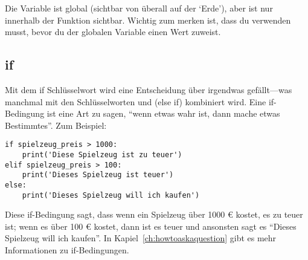 Die Variable  ist global (sichtbar von überall auf der `Erde'), aber  ist nur innerhalb der Funktion sichtbar. Wichtig zum merken ist, dass du  verwenden musst, bevor du der globalen Variable einen Wert zuweist.

\subsection*{if}

Mit dem if Schlüsselwort wird eine Entscheidung über irgendwas gefällt---was manchmal mit den Schlüsselworten  und  (else if) kombiniert wird. Eine if-Bedingung ist eine Art zu sagen, ``wenn etwas wahr ist, dann mache etwas Bestimmtes''. Zum Beispiel:

\begin{Verbatim}[frame=single]
if spielzeug_preis > 1000:
    print('Diese Spielzeug ist zu teuer')
elif spielzeug_preis > 100:
    print('Dieses Spielzeug ist teuer')
else:
    print('Dieses Spielzeug will ich kaufen')
\end{Verbatim}

Diese if-Bedingung sagt, dass wenn ein Spielzeug über 1000 € kostet, es zu teuer ist; wenn es über 100 € kostet, dann ist es teuer und ansonsten sagt es ``Dieses Spielzeug will ich kaufen''. In Kapiel~\ref{ch:howtoaskaquestion} gibt es mehr Informationen zu if-Bedingungen.

